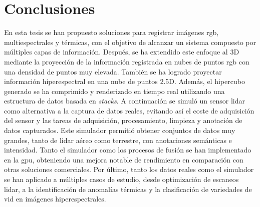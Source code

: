 \setchapterpreamble[u]{\margintoc}
\chapter{Conclusiones}
\label{sec:conclusions_spanish}

En esta tesis se han propuesto soluciones para registrar imágenes \acrshort{rgb}, multiespectrales y térmicas, con el objetivo de alcanzar un sistema compuesto por múltiples capas de información. Después, se ha extendido este enfoque al 3D mediante la proyección de la información registrada en nubes de puntos \acrshort{rgb} con una densidad de puntos muy elevada. También se ha logrado proyectar información hiperespectral en una nube de puntos 2.5D. Además, el hipercubo generado se ha comprimido y renderizado en tiempo real utilizando una estructura de datos basada en \textit{stacks}. A continuación se simuló un sensor \acrshort{lidar} como alternativa a la captura de datos reales, evitando así el coste de adquisición del sensor y las tareas de adquisición, procesamiento, limpieza y anotación de datos capturados. Este simulador permitió obtener conjuntos de datos muy grandes, tanto de \acrshort{lidar} aéreo como terrestre, con anotaciones semánticas e intensidad. Tanto el simulador como los procesos de fusión se han implementado en la \acrshort{gpu}, obteniendo una mejora notable de rendimiento en comparación con otras soluciones comerciales. Por último, tanto los datos reales como el simulador se han aplicado a múltiples casos de estudio, desde optimización de escaneos \acrshort{lidar}, a la identificación de anomalías térmicas y la clasificación de variedades de vid en imágenes hiperespectrales. 


